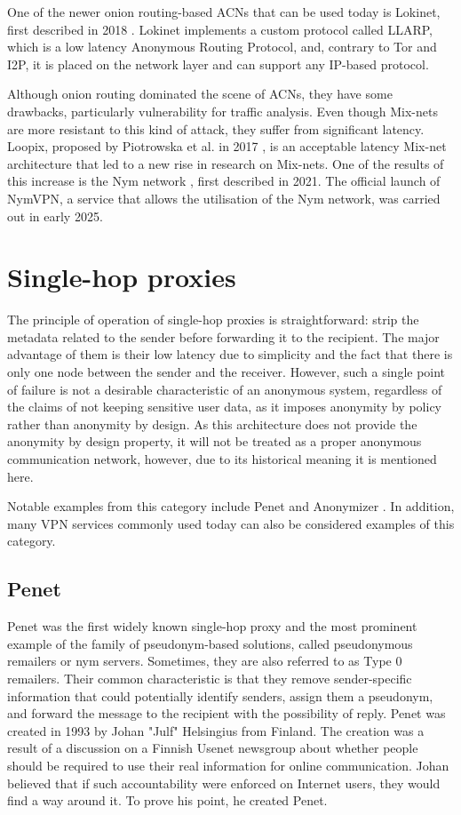 One of the newer onion routing-based ACNs that can be used today is Lokinet, first described in 2018 \cite{loki}. Lokinet implements a custom protocol called LLARP, which is a low latency Anonymous Routing Protocol, and, contrary to Tor and I2P, it is placed on the network layer and can support any IP-based protocol.

Although onion routing dominated the scene of ACNs, they have some drawbacks, particularly vulnerability for traffic analysis. Even though Mix-nets are more resistant to this kind of attack, they suffer from significant latency. Loopix, proposed by Piotrowska et al. in 2017 \cite{loopix}, is an acceptable latency Mix-net architecture that led to a new rise in research on Mix-nets. One of the results of this increase is the Nym network \cite{nym}, first described in 2021. The official launch of NymVPN, a service that allows the utilisation of the Nym network, was carried out in early 2025.

\section{Single-hop proxies}
The principle of operation of single-hop proxies is straightforward: strip the metadata related to the sender before forwarding it to the recipient. The major advantage of them is their low latency due to simplicity and the fact that there is only one node between the sender and the receiver. However, such a single point of failure is not a desirable characteristic of an anonymous system, regardless of the claims of not keeping sensitive user data, as it imposes anonymity by policy rather than anonymity by design. As this architecture does not provide the anonymity by design property, it will not be treated as a proper anonymous communication network, however, due to its historical meaning it is mentioned here.

Notable examples from this category include Penet \cite{penet} and Anonymizer \cite{anonymizer}. In addition, many VPN services commonly used today can also be considered examples of this category.

\subsection{Penet}
Penet was the first widely known single-hop proxy and the most prominent example of the family of pseudonym-based solutions, called pseudonymous remailers or nym servers. Sometimes, they are also referred to as Type 0 remailers. Their common characteristic is that they remove sender-specific information that could potentially identify senders, assign them a pseudonym, and forward the message to the recipient with the possibility of reply. Penet was created in 1993 by Johan "Julf" Helsingius from Finland. The creation was a result of a discussion on a Finnish Usenet newsgroup about whether people should be required to use their real information for online communication. Johan believed that if such accountability were enforced on Internet users, they would find a way around it. To prove his point, he created Penet.


